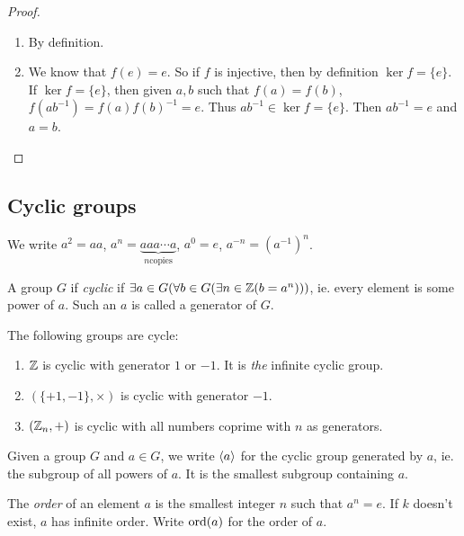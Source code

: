 \documentclass[a4paper]{article}
\begin{document}
  \begin{proof}\leavevmode
    \begin{enumerate}
      \item By definition.
      \item We know that $f(e) = e$. So if $f$ is injective, then by definition $\ker f = \{e\}$. If $\ker f = \{e\}$, then given $a, b$ such that $f(a) = f(b)$, $f(ab^{-1}) = f(a)f(b)^{-1} = e$. Thus $ab^{-1}\in \ker f = \{e\}$.  Then $ab^{-1} = e$ and $a = b$.
    \end{enumerate}
  \end{proof}

  \subsection{Cyclic groups}
  \begin{notation}
    We write $a^2 = aa$, $a^n = \underbrace{aaa\cdots a}_{n \text{copies}}$, $a^0 = e$, $a^{-n} = (a^{-1})^n$.
  \end{notation}

  \begin{defi}
    A group $G$ if \emph{cyclic} if $\exists a\in G(\forall b\in G(\exists n\in\mathbb{Z}(b=a^n)))$, ie. every element is some power of $a$. Such an $a$ is called a generator of $G$.
  \end{defi}

  \begin{eg}
    The following groups are cycle:
    \begin{enumerate}
      \item $\mathbb{Z}$ is cyclic with generator $1$ or $-1$. It is \emph{the} infinite cyclic group.
      \item $(\{+1, -1\}, \times)$ is cyclic with generator $-1$.
      \item $(\mathbb{Z}_n, +)$ is cyclic with all numbers coprime with $n$ as generators.
    \end{enumerate}
  \end{eg}

  \begin{notation}
    Given a group $G$ and $a\in G$, we write $\langle a\rangle$ for the cyclic group generated by $a$, ie. the subgroup of all powers of $a$. It is the smallest subgroup containing $a$.
  \end{notation}

  \begin{defi}
    The \emph{order} of an element $a$ is the smallest integer $n$ such that $a^n = e$. If $k$ doesn't exist, $a$ has infinite order. Write $\operatorname{ord}(a)$ for the order of $a$.
  \end{defi}
\end{document}
